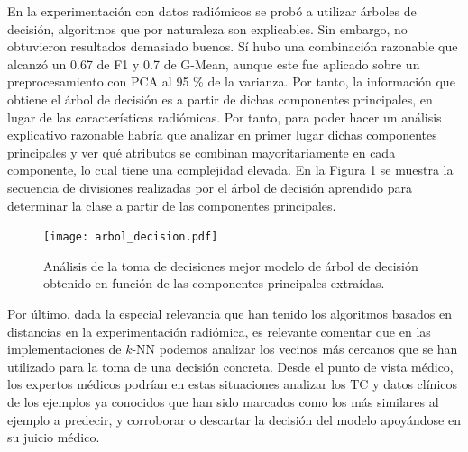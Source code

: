 En la experimentación con datos radiómicos se probó a utilizar árboles de decisión, algoritmos que por naturaleza son explicables. Sin embargo, no obtuvieron resultados demasiado buenos. Sí hubo una combinación razonable que alcanzó un 0.67 de F1 y 0.7 de G-Mean, aunque este fue aplicado sobre un preprocesamiento con PCA al 95 \% de la varianza. Por tanto, la información que obtiene el árbol de decisión es a partir de dichas componentes principales, en lugar de las características radiómicas. Por tanto, para poder hacer un análisis explicativo razonable habría que analizar en primer lugar dichas componentes principales y ver qué atributos se combinan mayoritariamente en cada componente, lo cual tiene una complejidad elevada. En la Figura \ref{fig:expl_arbol} se muestra la secuencia de divisiones realizadas por el árbol de decisión aprendido para determinar la clase a partir de las componentes principales.

\begin{figure}
    \texttt{[image: arbol\_decision.pdf]} \caption{Análisis de la toma de decisiones mejor modelo de árbol de decisión obtenido en función de las componentes principales extraídas.}\label{fig:expl_arbol}
\end{figure}

Por último, dada la especial relevancia que han tenido los algoritmos basados en distancias en la experimentación radiómica, es relevante comentar que en las implementaciones de $k$-NN podemos analizar los vecinos más cercanos que se han utilizado para la toma de una decisión concreta. Desde el punto de vista médico, los expertos médicos podrían en estas situaciones analizar los TC y datos clínicos de los ejemplos ya conocidos que han sido marcados como los más similares al ejemplo a predecir, y corroborar o descartar la decisión del modelo apoyándose en su juicio médico.


\endinput
